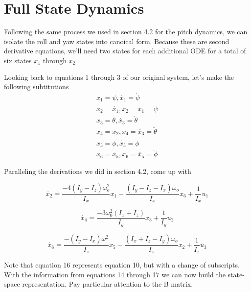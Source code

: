 \documentclass{article}
\begin{document}
\section{Full State Dynamics}
Following the same process we used in section 4.2 for the pitch dynamics, we can isolate the roll and yaw states into canoical form.
Because these are second derivative equations, we'll need two states for each additional ODE for a total of six states $x_1$ through $x_2$

Looking back to equations 1 through 3 of our original system, let's make the following subtitutions
\begin{equation}
  \begin{split}
  x_1 = \psi, \dot{x_1} = \dot{\psi} \\
  x_2 = \dot{x_1}, \dot{x_2} = \ddot{x_1} = \ddot{\psi} \\
  x_3 = \theta, \dot{x_3} = \dot{\theta}\\
  x_4 = \dot{x_2}, \dot{x_4} = \ddot{x_3} = \ddot{\theta} \\
  x_5 = \phi, \dot{x_5} = \dot{\phi} \\
  x_6 = \dot{x_5}, \dot{x_6} = \ddot{x_5} = \ddot{\phi}
  \end{split}
\end{equation}

Paralleling the derivations we did in section 4.2, come up with

\begin{equation}
  \dot{x_2} = \frac{-4(I_y - I_z)\omega^{2}_{o}}{I_x} x_1 -
              \frac{(I_y - I_z - I_x)\omega_o}{I_x} x_6 +
              \frac{1}{I_x} u_1
\end{equation}

\begin{equation}
  \dot{x_4} = \frac{-3\omega^{2}_{0}(I_{x} + I_{z})}{I_y} x_3 +
              \frac{1}{I_y} u_2
\end{equation}

\begin{equation}
  \dot{x_6} = \frac{-(I_y - I_x)\omega^2}{I_z} x_5 -
             \frac{(I_x + I_z - I_y) \omega_o}{I_z} x_2 +
             \frac{1}{I_z} u_3
\end{equation}

Note that equation 16 represents equation 10, but with a change of subscripts.
With the information from equations 14 through 17 we can now build the state-space representation.
Pay particular attention to the B matrix.
\end{document}
